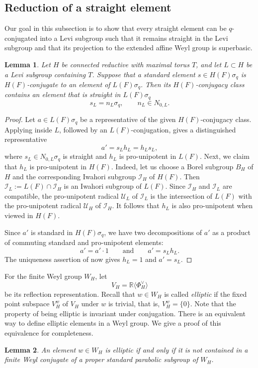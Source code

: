 \documentclass[11pt]{amsart}
\numberwithin{equation}{section}
\newtheorem{lemma}[lemma]{Lemma}
\theoremstyle{definition}
\theoremstyle{remark}
\begin{document}
\subsection{Reduction of a straight element}
Our goal in this subsection is to show that every straight element can be $q$-conjugated into a Levi subgroup such that it remains straight in the Levi subgroup and that its projection to the extended affine Weyl group is superbasic.
\begin{lemma}\label{lem:standard-in-levi}
Let $H$ be connected reductive with maximal torus $T$, and let $L\subset H$ be a
Levi subgroup containing $T$.  Suppose that a standard element
$s\in H(F)\sigma_q$ is $H(F)$-conjugate to an element
of $L(F)\sigma_q$.  Then its $H(F)$-conjugacy class
contains an element that is straight in $L(F)\sigma_q$
\[
  s_L=n_L\sigma_q,
  \qquad n_L\in N_{0,L}.
\]
\end{lemma}

\begin{proof}

Let $a\in L(F)\sigma_q$ be a representative of the given $H(F)$-conjugacy class.  Applying
\cite[Theorem~1.1(b)]{NZ} inside $L$, followed by an $L(F)$-conjugation, gives a distinguished representative
\[
  a'=s_Lh_L=h_Ls_L,
\]
where $s_L\in N_{0,L}\sigma_q$ is straight and $h_L$ is pro-unipotent in
$L(F)$. Next, we claim that $h_L$ is pro-unipotent in $H(F)$. Indeed, let us choose a Borel subgroup $B_H$ of $H$ and the corresponding Iwahori subgroup $\mathcal{I}_H$ of $H(F)$. Then $\mathcal{I}_L:=L(F)\cap\mathcal{I}_H$ is an Iwahori subgroup of $L(F)$.  Since $\mathcal{I}_H$ and $\mathcal{I}_L$ are compatible, the
pro-unipotent radical $\mathcal{U}_L$ of $\mathcal{I}_L$ is the intersection of $L(F)$ with the pro-unipotent radical $\mathcal{U}_H$ of $\mathcal{I}_H$. It follows that $h_L$ is also pro-unipotent when viewed in
$H(F)$.

Since $a'$ is standard in $H(F)\sigma_q$, we have two decompositions of
$a'$ as a product of commuting standard and pro-unipotent elements:
\[
  a'=a'\cdot1
  \qquad\text{and}\qquad
  a'=s_Lh_L.
\]
The uniqueness assertion of \cite[Theorem~1.1(a)]{NZ} now gives
$h_L=1$ and $a'=s_L$.
\end{proof}

For the finite Weyl group $W_H$, let
\[
  V_H=\mathbb R\langle\Phi_H^\vee\rangle
\]
be its reflection representation. Recall \cite{Lus2} that $w\in W_H$ is called
\emph{elliptic} if the fixed point subspace $V_H^w$ of $V_H$ under $w$ is trivial, that is, $V_H^w=\{0\}$. Note that the property of being elliptic is invariant under conjugation. There is an equivalent way \cite{Lus1} to define elliptic elements in a Weyl group. We give a proof of this equivalence for completeness.
\begin{lemma}\label{lem:elliptic-parabolic}
An element $w\in W_H$ is elliptic if and only if it is not contained in a
finite Weyl conjugate of a proper standard parabolic subgroup of $W_H$.
\end{lemma}
\end{document}

